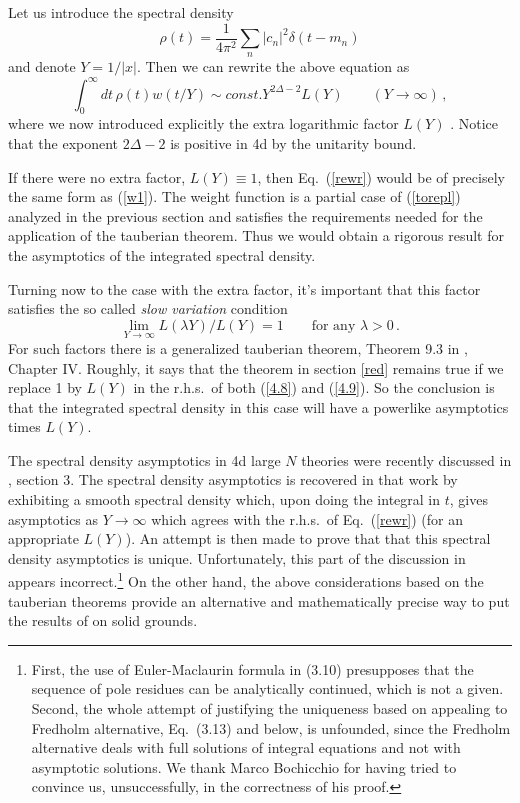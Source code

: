 \documentclass[12pt]{article}
\newcommand{\reef}[1]{(\ref{#1})}
\newcommand{\beq}{\begin{equation}}
\newcommand{\eeq}{\end{equation}}
\numberwithin{equation}{section}
\begin{document}
Let us introduce the spectral density 
\beq
\rho(t)= \frac 1{4\pi^2}\sum_n |c_n|^2 \delta (t-m_n)
\eeq
and denote $Y=1/|x|$. Then we can rewrite the above equation as
\beq
\label{rewr}
\int_0^\infty dt\,\rho(t) w(t/Y)\sim const.  Y^{2\Delta-2} L(Y) \qquad (Y\to \infty)\,,
\eeq
where we now introduced explicitly the extra logarithmic factor $L(Y)$ . Notice that the exponent $2\Delta-2$ is positive in 4d by the unitarity bound. 

If there were no extra factor, $L(Y)\equiv 1$, then Eq.~\reef{rewr} would be of precisely the same form as \reef{w1}. The weight function is a partial case of \reef{torepl} analyzed in the previous section and satisfies the requirements needed for the application of the tauberian theorem. Thus we would obtain a rigorous result for the asymptotics of the integrated spectral density.

Turning now to the case with the extra factor, it's important that this factor satisfies the so called \emph{slow variation} condition
\beq 
\lim_{Y\to\infty} L(\lambda Y)/L(Y) = 1\qquad\text{for any $\lambda>0$}\,.
\eeq
For such factors there is a generalized tauberian theorem, Theorem 9.3 in \cite{Korevaar}, Chapter IV. Roughly, it says that the theorem in section \ref{red} remains true if we replace 1 by $L(Y)$ in the r.h.s.~of both \reef{4.8} and \reef{4.9}. So the conclusion is that the integrated spectral density in this case will have a powerlike asymptotics times $L(Y)$.

{The spectral density asymptotics in 4d large $N$ theories were recently discussed in \cite{Bochicchio:2013eda}, section 3. The spectral density asymptotics is recovered in that work by exhibiting a smooth spectral density which, upon doing the integral in $t$, gives asymptotics as $Y\to\infty$ which agrees with the r.h.s.~of Eq.~\reef{rewr} (for an appropriate $L(Y)$). An attempt is then made to prove that that this spectral density asymptotics is unique. Unfortunately, this part of the discussion in \cite{Bochicchio:2013eda} appears incorrect.\footnote{First, the use of Euler-Maclaurin formula in (3.10) presupposes that the sequence of pole residues can be analytically continued, which is not a given. Second, the whole attempt of justifying the uniqueness based on appealing to Fredholm alternative, Eq.~(3.13) and below, is unfounded, since the Fredholm alternative deals with full solutions of integral equations and not with asymptotic solutions. We thank Marco Bochicchio for having tried to convince us, unsuccessfully, in the correctness of his proof.} On the other hand, the above considerations based on the tauberian theorems provide an alternative and mathematically precise way to put the results of \cite{Bochicchio:2013eda} on solid grounds.}
\end{document}
